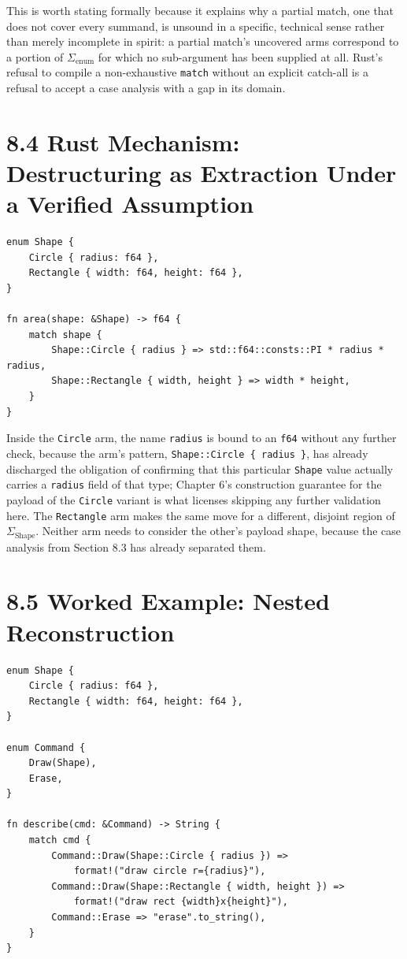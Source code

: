 \documentclass[11pt]{book}
\begin{document}
This is worth stating formally because it explains why a partial match, one that does not cover every summand, is unsound in a specific, technical sense rather than merely incomplete in spirit: a partial match's uncovered arms correspond to a portion of $\Sigma_{\text{enum}}$ for which no sub-argument has been supplied at all. Rust's refusal to compile a non-exhaustive \texttt{match} without an explicit catch-all is a refusal to accept a case analysis with a gap in its domain.

\section*{8.4 Rust Mechanism: Destructuring as Extraction Under a Verified Assumption}

\begin{lstlisting}
enum Shape {
    Circle { radius: f64 },
    Rectangle { width: f64, height: f64 },
}

fn area(shape: &Shape) -> f64 {
    match shape {
        Shape::Circle { radius } => std::f64::consts::PI * radius * radius,
        Shape::Rectangle { width, height } => width * height,
    }
}
\end{lstlisting}

Inside the \texttt{Circle} arm, the name \texttt{radius} is bound to an \texttt{f64} without any further check, because the arm's pattern, \texttt{Shape::Circle \{ radius \}}, has already discharged the obligation of confirming that this particular \texttt{Shape} value actually carries a \texttt{radius} field of that type; Chapter 6's construction guarantee for the payload of the \texttt{Circle} variant is what licenses skipping any further validation here. The \texttt{Rectangle} arm makes the same move for a different, disjoint region of $\Sigma_{\text{Shape}}$. Neither arm needs to consider the other's payload shape, because the case analysis from Section 8.3 has already separated them.

\section*{8.5 Worked Example: Nested Reconstruction}

\begin{lstlisting}
enum Shape {
    Circle { radius: f64 },
    Rectangle { width: f64, height: f64 },
}

enum Command {
    Draw(Shape),
    Erase,
}

fn describe(cmd: &Command) -> String {
    match cmd {
        Command::Draw(Shape::Circle { radius }) =>
            format!("draw circle r={radius}"),
        Command::Draw(Shape::Rectangle { width, height }) =>
            format!("draw rect {width}x{height}"),
        Command::Erase => "erase".to_string(),
    }
}
\end{lstlisting}
\end{document}
